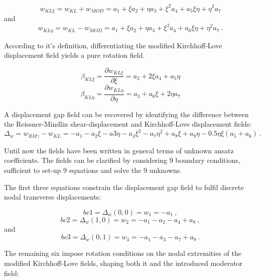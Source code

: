 \begin{equation} 
w_{KL \xi} = w_{KL} + w_{MOD} = a_1 + \xi a_2 + \eta a_3 + \xi^2 a_4 +a_5 \xi \eta + \eta^2 a_7
\label{eqDSGc3_4}
\end{equation}
and
\begin{equation} 
w_{KL \eta} = w_{KL} - w_{MOD} = a_1 + \xi a_2 + \eta a_3 + \xi^2 a_4 +a_6 \xi \eta + \eta^2 a_7
\label{eqDSGc3_5}\ .
\end{equation}

According to it's definition, differentiating the modified Kirchhoff-Love displacement field yields a pure rotation field.

\begin{equation} 
\beta_{KL \xi} = \frac{\partial w_{KL \xi}}{\partial \xi}  = a_2 + 2 \xi a_4 +a_5 \eta
\label{eqDSGc3_8}
\end{equation}
\begin{equation} 
\beta_{KL \eta} = \frac{\partial w_{KL \eta}}{\partial \eta}  =a_3 +a_6 \xi + 2 \eta a_7
\label{eqDSGc3_9}
\end{equation}

A displacement gap field can be recovered by identifying the difference between the Reissner-Mindlin shear-displacement and Kirchhoff-Love displacement fields:
\begin{equation} 
\Delta_w = w_{RM\gamma} - w_{KL}  =-a_1 - a_2\xi - a3\eta - a_4\xi^2 - a_7\eta^2 + a_8\xi + a_9\eta - 0.5\eta\xi(a_5 + a_6)
\label{eqDSGc3_10}\ .
\end{equation}

Until now the fields have been written in general terms of unknown ansatz coefficients. The fields can be clarified by considering 9 boundary conditions, sufficient to set-up 9 equations and solve the 9 unknowns.

The first three equations constrain the displacement gap field to fulfil discrete nodal transverse displacements:

\begin{equation} 
bc1 = \Delta_w(0,0) = w_1 = -a_1
\label{eqDSGc3_11}\ ,
\end{equation}
\begin{equation} 
bc2 = \Delta_w(1,0) = w_2 = -a_1 -a_2 -a_4 + a_8
\label{eqDSGc3_12}\ ,
\end{equation}
and
\begin{equation} 
bc3 = \Delta_w(0,1) = w_3 = -a_1 -a_3 -a_7 + a_9
\label{eqDSGc3_13}\ .
\end{equation}

The remaining six impose rotation conditions on the nodal extremities of the modified Kirchhoff-Love fields, shaping both it and the introduced moderator field:

